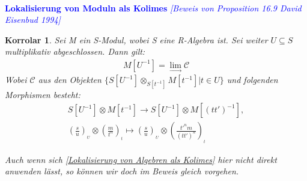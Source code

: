 \documentclass[10pt,a4paper]{report}
\newcommand{\comment}[1]{}
\newcommand{\ModulsOfDifferenzials}{David Eisenbud 1994}
\newcounter{Aussage}[chapter]
\newtheorem{korrolar}[Aussage]{Korrolar}
\newcommand{\Tensor}[3]{#1 \otimes_{#2} #3}
\newcommand{\tensor}[3]{#1 \otimes #3}
\newcommand{\lok}[2]{#1 [#2^{-1}]}
\newcommand{\loke}[3]{(\frac{#1}{#2})_{_{#3}}}
\newcommand{\colimes}[0]{\lim\limits_{ \longrightarrow }}
\begin{document}
\ \\
\textcolor{blue}{\textbf{Lokalisierung von Moduln als Kolimes} \textit{[Beweis von Proposition 16.9 \ModulsOfDifferenzials]}}
\begin{korrolar}\comment{\label{Lokalisierung von Moduln als Kolimes}}
Sei M ein S-Modul, wobei S eine R-Algebra ist. Sei weiter $U \subseteq S$ multiplikativ abgeschlossen. Dann gilt:
\begin{gather*}
\lok{M}{U} = \colimes \mathcal{C}
\end{gather*}
Wobei $\mathcal{C}$ aus den Objekten $\lbrace \Tensor{\lok{S}{U}}{\lok{S}{t}}{\lok{M}{t}} \vert t \in U \rbrace$ und folgenden Morphismen besteht:
\begin{gather*}
\tensor{\lok{S}{U}}{\lok{S}{t}}{\lok{M}{t}} \longrightarrow
\tensor{\lok{S}{U}}{\lok{S}{(tt')}}{\lok{M}{(tt')}} ,\\
\tensor{\loke{s}{u}{U}}{\lok{S}{t}}{\loke{m}{t^n}{t}} \longmapsto
\tensor{\loke{s}{u}{U}}{\lok{S}{t}}{\loke{t'^nm}{(tt')^n}{t}} 
\end{gather*}
\end{korrolar}
\textit{Auch wenn sich \cref{Lokalisierung von Algebren als Kolimes} hier nicht direkt anwenden lässt, so können wir doch im Beweis gleich vorgehen.}
\end{document}
